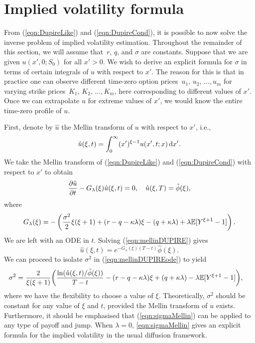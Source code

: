 \section{Implied volatility formula}
From (\ref{eqn:DupireLike}) and (\ref{eqn:DupireCond}), it is possible to now solve the inverse problem of implied volatility estimation. Throughout the remainder of this section, we will assume that~$r$, $q$, and $\sigma$ are constants. Suppose that we are given $u(x',0;S_0)$ for all $x' > 0$. We wish to derive an explicit formula for $\sigma$ in terms of certain integrals of $u$ with respect to $x'$. The reason for this is that in practice one can observe different time-zero option prices~$u_1,\, u_2, \, \ldots, u_m$ for varying strike prices~$K_1, \, K_2, \, \ldots, K_m$, here corresponding to different values of $x'$. Once we can extrapolate $u$ for extreme values of $x'$, we would know the entire time-zero profile of $u$.

First, denote by $\hat u$ the Mellin transform of $u$ with respect to $x'$, i.e.,
	\begin{equation*}
		\hat u(\xi,t) = \int_0^\infty (x')^{\xi-1} u(x',t; x) \, \mathrm d x'.
	\end{equation*}
We take the Mellin transform of (\ref{eqn:DupireLike}) and (\ref{eqn:DupireCond}) with respect to $x'$ to obtain
	\begin{align}
		\label{eqn:mellinDUPIRE}
		\begin{split}
			\frac{\partial \hat u}{\partial t} - G_{\lambda}(\xi)\hat u(\xi,t) = 0, \quad \hat u(\xi,T) = \hat \phi(\xi),
		\end{split}
	\end{align}
where
	\begin{equation}
		G_{\lambda}(\xi) = -\left( \frac{\sigma^2}{2}\xi(\xi+1) + (r - q - \kappa\lambda)\xi - (	q + \kappa\lambda) + \lambda\mathbb E[Y^{\xi+1} - 1] \right).
	\end{equation}
We are left with an ODE in $t$. Solving (\ref{eqn:mellinDUPIRE}) gives
	\begin{equation}
		\label{eqn:mellinDUPIREode}
		\hat u(\xi,t) = e^{-G_{\lambda}(\xi)(T-t)}\hat \phi(\xi).
	\end{equation}
We can proceed to isolate $\sigma^2$ in (\ref{eqn:mellinDUPIREode}) to yield
	\begin{align}
		\label{eqn:sigmaMellin}
		\begin{split}
		\sigma^2 &= \frac{2}{\xi(\xi+1)}\bigg( \frac{\ln( \hat u(\xi,t)/\hat\phi(\xi) )}{T-t} - (r-q-\kappa\lambda)\xi + (q+\kappa\lambda) - \lambda\mathbb E[Y^{\xi+1} - 1] \bigg),
		\end{split}
	\end{align}
where we have the flexibility to choose a value of $\xi$. Theoretically, $\sigma^2$ should be constant for any value of $\xi$ and $t$, provided the Mellin transform of $u$ exists. Furthermore, it should be emphasised that (\ref{eqn:sigmaMellin}) can be applied to any type of payoff and jump. When $\lambda = 0$, \eqref{eqn:sigmaMellin} gives an explicit formula for the implied volatility in the usual diffusion framework.

